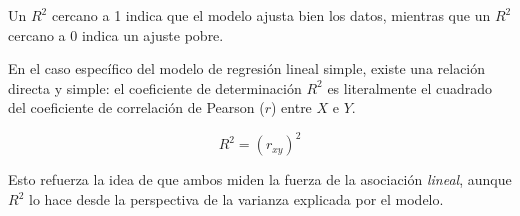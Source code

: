 \documentclass[
  letterpaper,
  DIV=11,
  numbers=noendperiod]{scrreprt}
\begin{document}
Un \(R^2\) cercano a 1 indica que el modelo ajusta bien los datos,
mientras que un \(R^2\) cercano a 0 indica un ajuste pobre.

\begin{tcolorbox}[enhanced jigsaw, leftrule=.75mm, breakable, colbacktitle=quarto-callout-note-color!10!white, bottomrule=.15mm, colframe=quarto-callout-note-color-frame, toprule=.15mm, colback=white, coltitle=black, bottomtitle=1mm, left=2mm, title=\textcolor{quarto-callout-note-color}{\faInfo}\hspace{0.5em}{Relación entre R² y el coeficiente de correlación}, opacityback=0, arc=.35mm, opacitybacktitle=0.6, toptitle=1mm, titlerule=0mm, rightrule=.15mm]

En el caso específico del modelo de regresión lineal simple, existe una
relación directa y simple: el coeficiente de determinación \(R^2\) es
literalmente el cuadrado del coeficiente de correlación de Pearson
(\(r\)) entre \(X\) e \(Y\).

\[ R^2 = (r_{xy})^2 \]

Esto refuerza la idea de que ambos miden la fuerza de la asociación
\emph{lineal}, aunque \(R^2\) lo hace desde la perspectiva de la
varianza explicada por el modelo.

\end{tcolorbox}
\end{document}
